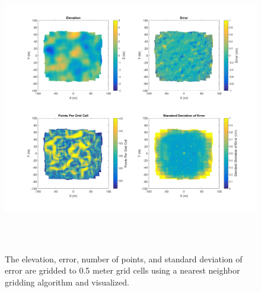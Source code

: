 \begin{figure}[H]
	\centering
	\includegraphics[height = 5in]{../fig/spatialmedium}

	\caption{The elevation, error, number of points, and standard deviation of error are gridded to 0.5 meter grid cells using a nearest neighbor gridding algorithm and visualized.}
	\label{fig:spatial}
\end{figure}